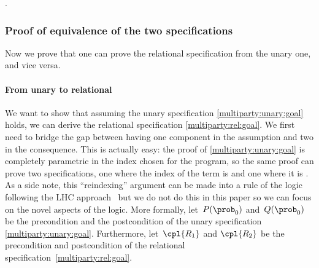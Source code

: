 \begin{eqexplain}
{   }
  \whichproves
\CC{\hat\prob} .
  \whichproves
{}
\end{eqexplain}


\subsubsection{Proof of equivalence of the two specifications}

Now we prove that one can prove the relational specification from the unary one,
and vice versa.


\paragraph{From unary to relational}
We want to show that
assuming the unary specification \eqref{multiparty:unary:goal} holds,
we can derive the relational specification \eqref{multiparty:rel:goal}.
We first need to bridge the gap between having one component
in the assumption and two in the consequence.
This is actually easy: the proof of \eqref{multiparty:unary:goal} is
completely parametric in the index chosen for the program,
so the same proof can prove two specifications, one where the index of the term is  and one where it is .
As a side note, this ``reindexing'' argument can be made into a rule of the logic following the LHC approach~\cite{d2022proving} but we do not do this
in this paper so we can focus on the novel aspects of the logic.
More formally, let~$P(\prob_0)$ and~$Q(\prob_0)$ be the precondition and the postcondition
of the unary specification \eqref{multiparty:unary:goal}.
Furthermore, let~$ \cpl{R_1} $ and $ \cpl{R_2} $ be the precondition and postcondition of the relational specification~\eqref{multiparty:rel:goal}.

